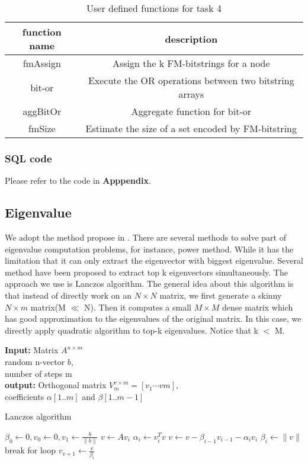 \begin{table}[[!htbf]
\caption{User defined functions for task 4}
\begin{center}
\begin{tabular}{|c|c|}
\hline \hline
function name & description \\
\hline
fmAssign & Assign the k FM-bitstrings for a node \\
bit-or & Execute the OR operations between two bitstring arrays \\
aggBitOr & Aggregate function for bit-or \\
fmSize & Estimate the size of a set encoded by FM-bitstring \\
\hline

\end{tabular}
\end{center}
\label{table:radius}
\end{table}%


\subsubsection{SQL code}
Please refer to the code in {\bf Apppendix}.

\subsection{Eigenvalue}
We adopt the method propose in \cite{kang2011spectral}. There are several methods to solve part of eigenvalue computation problems, for instance, power method\cite{langville2004deeper}. While it has the limitation that it can only extract the eigenvector with biggest eigenvalue. Several method have been proposed to extract top k eigenvectors simultaneously. The approach we use is Lanczos algorithm\cite{lanczos1950iteration}. The general idea about this algorithm is that instead of directly work on an $N \times N$ matrix, we first generate a skinny $N \times m$ matrix(M $\ll$ N). Then it computes a small $M \times M$ dense matrix which has good approximation to the eigenvalues of the original matrix. In this case, we directly apply quadratic algorithm to top-k eigenvalues. Notice that k $<$ M.

\begin{algorithm}
{\bf Input:} Matrix $A^{n \times m}$\\
random n-vector $b$,\\
number of steps m\\
{\bf output:} Orthogonal matrix $ V^{v \times m}_{m} = [v_{1}\cdots v{m}]$,\\
coefficients $\alpha[1..m]$ and $\beta[1..m-1]$
\begin{algorithmic}[1]
\caption{Lanczos algorithm}
\STATE $\beta_{0} \leftarrow 0, v_{0} \leftarrow 0, v_{1} \leftarrow \frac{b}{\parallel b \parallel}$ 
	\STATE $v \leftarrow Av_{i}$
	\STATE $\alpha_{i} \leftarrow v^{T}_{i}v $
	\STATE $v \leftarrow v - \beta_{i-1}v_{i-1} - \alpha_{i}v_{i}$
	\STATE $\beta_{i} \leftarrow \parallel v\parallel $
	\STATE break for loop 
	\ENDIF
	\STATE $ v_{v+1} \leftarrow \frac{v}{\beta_{i}} $
\ENDFOR
\end{algorithmic}
\label{eigen:algo1}
\end{algorithm}

